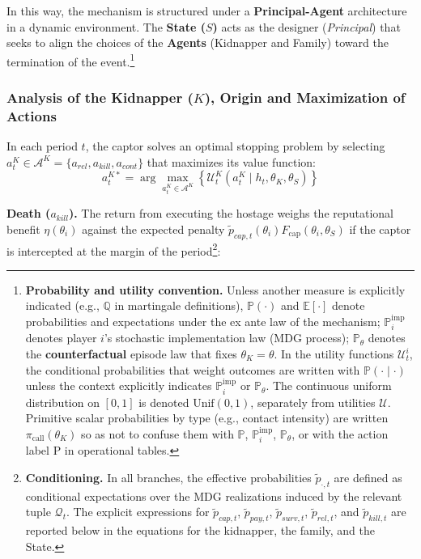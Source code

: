 \documentclass[12pt,a4paper]{article}
\theoremstyle{plain}
\theoremstyle{definition}
\theoremstyle{remark}
\newcommand{\ProbE}{\mathbb{P}}
\newcommand{\ProbC}[1]{\mathbb{P}_{#1}}
\newcommand{\ProbI}[1]{\mathbb{P}_{#1}^{\mathrm{imp}}}
\newcommand{\E}{\mathbb{E}}
\newcommand{\1}{\mathbf{1}}
\newcommand{\Unif}{\mathrm{Unif}}
\begin{document}
In this way, the mechanism is structured under a \textbf{Principal-Agent} architecture in a dynamic environment. The \textbf{State ($S$)} acts as the designer (\textit{Principal}) that seeks to align the choices of the \textbf{Agents} (Kidnapper and Family) toward the termination of the event.\footnote{%
\textbf{Probability and utility convention.} Unless another measure is explicitly indicated \textup{(}e.g., $\mathbb{Q}$ in martingale definitions\textup{)}, $\ProbE(\cdot)$ and $\E[\cdot]$ denote probabilities and expectations under the ex ante law of the mechanism; $\ProbI{i}$ denotes player $i$'s stochastic implementation law \textup{(}MDG process\textup{)}; $\ProbC{\theta}$ denotes the \textbf{counterfactual} episode law that fixes $\theta_K=\theta$. In the utility functions $\mathcal{U}_t^{i}$, the conditional probabilities that weight outcomes are written with $\ProbE(\cdot\mid\cdot)$ unless the context explicitly indicates $\ProbI{i}$ or $\ProbC{\theta}$. The continuous uniform distribution on $[0,1]$ is denoted $\Unif(0,1)$, separately from utilities $\mathcal{U}$. Primitive scalar probabilities by type \textup{(}e.g., contact intensity\textup{)} are written $\pi_{\mathrm{call}}(\theta_K)$ so as not to confuse them with $\ProbE$, $\ProbI{i}$, $\ProbC{\theta}$, or with the action label $\mathrm{P}$ in operational tables.}

\subsubsection[Analysis of kidnapper K]{Analysis of the Kidnapper ($K$), Origin and Maximization of Actions}
In each period $t$, the captor solves an optimal stopping problem by selecting $a^K_t\in\mathcal{A}^K=\{a_{rel},a_{kill},a_{cont}\}$ that maximizes its value function:
\begin{equation}
\label{eq:kidnapper-argmax}
    a_t^{K\ast} = \arg \max_{a^K_t \in \mathcal{A}^K} \left\{ \mathcal{U}^K_t(a^K_t \mid h_t, \theta_K, \theta_S) \right\}
\end{equation}

\noindent \textbf{Death ($a_{kill}$).} The return from executing the hostage weighs the reputational benefit $\eta(\theta_i)$ against the expected penalty $\tilde{p}_{cap,t}(\theta_i)F_{\mathrm{cap}}(\theta_i,\theta_S)$ if the captor is intercepted at the margin of the period\footnote{\textbf{Conditioning.} In all branches, the effective probabilities $\tilde p_{\cdot,t}$ are defined as conditional expectations over the MDG realizations induced by the relevant tuple $\mathcal Q_t$. The explicit expressions for $\tilde p_{cap,t}$, $\tilde p_{pay,t}$, $\tilde p_{surv,t}$, $\tilde p_{rel,t}$, and $\tilde p_{kill,t}$ are reported below in the equations for the kidnapper, the family, and the State.}:
\end{document}
